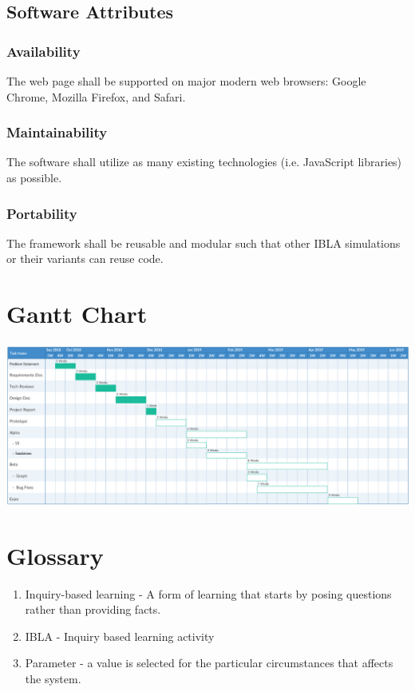 \documentclass[onecolumn, draftclsnofoot,10pt, compsoc]{IEEEtran}
\begin{document}
\subsection{Software Attributes}
\subsubsection{Availability}
The web page shall be supported on major modern web browsers: Google Chrome, Mozilla Firefox, and Safari.
\subsubsection{Maintainability}
The software shall utilize as many existing technologies (i.e. JavaScript libraries) as possible.
\subsubsection{Portability}
The framework shall be reusable and modular such that other IBLA simulations or their variants can reuse code.

\section{Gantt Chart}
\includegraphics[width=\textwidth]{GanttChart1.png}

\section{Glossary}
\begin{enumerate}
    \item Inquiry-based learning - A form of learning that starts by posing questions rather than providing facts.
    \item IBLA - Inquiry based learning activity
    \item Parameter - a value is selected for the particular circumstances that affects the system. 

\end{enumerate}
\end{document}

